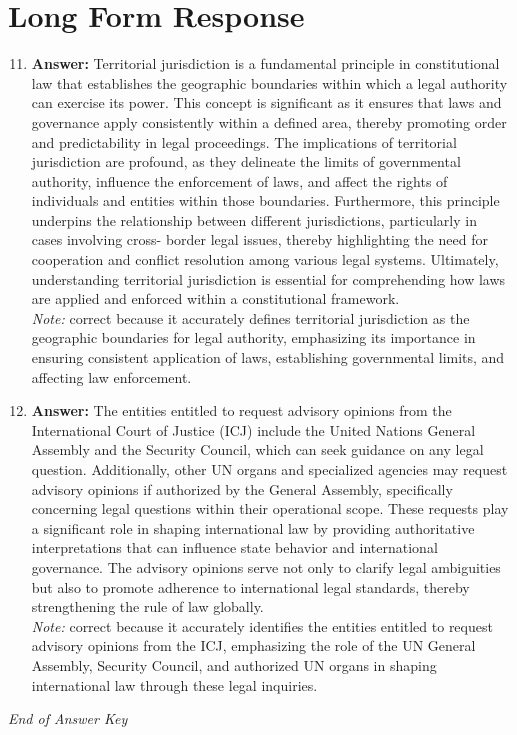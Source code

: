\documentclass[12pt]{article}
\begin{document}
\section*{Long Form Response}
\begin{enumerate}[label=\arabic*.]
\setcounter{enumi}{10}
\item \textbf{Answer:} Territorial jurisdiction is a fundamental principle in constitutional law that establishes the geographic boundaries within which a legal authority can exercise its power. This concept is significant as it ensures that laws and governance apply consistently within a defined area, thereby promoting order and predictability in legal proceedings. The implications of territorial jurisdiction are profound, as they delineate the limits of governmental authority, influence the enforcement of laws, and affect the rights of individuals and entities within those boundaries. Furthermore, this principle underpins the relationship between different jurisdictions, particularly in cases involving cross- border legal issues, thereby highlighting the need for cooperation and conflict resolution among various legal systems. Ultimately, understanding territorial jurisdiction is essential for comprehending how laws are applied and enforced within a constitutional framework.
\\ \textit{Note:} correct because it accurately defines territorial jurisdiction as the geographic boundaries for legal authority, emphasizing its importance in ensuring consistent application of laws, establishing governmental limits, and affecting law enforcement.
\item \textbf{Answer:} The entities entitled to request advisory opinions from the International Court of Justice (ICJ) include the United Nations General Assembly and the Security Council, which can seek guidance on any legal question. Additionally, other UN organs and specialized agencies may request advisory opinions if authorized by the General Assembly, specifically concerning legal questions within their operational scope. These requests play a significant role in shaping international law by providing authoritative interpretations that can influence state behavior and international governance. The advisory opinions serve not only to clarify legal ambiguities but also to promote adherence to international legal standards, thereby strengthening the rule of law globally.
\\ \textit{Note:} correct because it accurately identifies the entities entitled to request advisory opinions from the ICJ, emphasizing the role of the UN General Assembly, Security Council, and authorized UN organs in shaping international law through these legal inquiries.
\end{enumerate}

\vfill
\noindent\textit{End of Answer Key}
\end{document}
